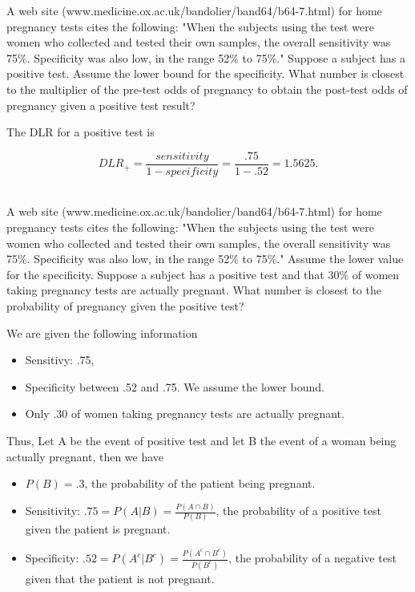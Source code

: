 \documentclass{homework}
\begin{document}
\begin{tcolorbox}[title=Question 2]
A web site (www.medicine.ox.ac.uk/bandolier/band64/b64-7.html) for home pregnancy tests cites the following: "When the subjects using the test were women who collected and tested their own samples, the overall sensitivity was 75\%. Specificity was also low, in the range 52\% to 75\%." Suppose a subject has a positive test. Assume the lower bound for the specificity. What number is closest to the multiplier of the pre-test odds of pregnancy to obtain the post-test odds of pregnancy given a positive test result?
\end{tcolorbox}

The DLR for a positive test is 

$$
DLR_{+} = \frac{sensitivity}{1-specificity} = \frac{.75}{1-.52} = 1.5625. 
$$ \\

\begin{tcolorbox}[title=Question 3]
A web site (www.medicine.ox.ac.uk/bandolier/band64/b64-7.html) for home pregnancy tests cites the following: "When the subjects using the test were women who collected and tested their own samples, the overall sensitivity was 75\%. Specificity was also low, in the range 52\% to 75\%." Assume the lower value for the specificity. Suppose a subject has a positive test and that 30\% of women taking pregnancy tests are actually pregnant. What number is closest to the probability of pregnancy given the positive test?
\end{tcolorbox}

We are given the following information

\begin{itemize}
    \item Sensitivy: .75,
    \item Specificity between .52 and .75. We assume the lower bound.
    \item Only .30 of women taking pregnancy tests are actually pregnant. 
\end{itemize}

Thus, Let A be the event of positive test and let B the event of a woman being actually pregnant, then we have

\begin{itemize}
    \item $P(B) = .3$, the probability of the patient being pregnant. 
    \item Sensitivity: $.75 = P(A|B) = \frac{P(A\cap B)}{P(B)}$, the probability of a positive test given the patient is pregnant.
    \item Specificity: $.52 = P(A^c | B^c) = \frac{P(A^c\cap B^c)}{P(B^c)}$, the probability of a negative test given that the patient is not pregnant. 
\end{itemize}
\end{document}
